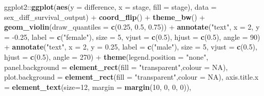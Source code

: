 \documentclass[]{article}
\newenvironment{Shaded}{\begin{snugshade}}{\end{snugshade}}
\newcommand{\KeywordTok}[1]{\textcolor[rgb]{0.13,0.29,0.53}{\textbf{{#1}}}}
\newcommand{\DataTypeTok}[1]{\textcolor[rgb]{0.13,0.29,0.53}{{#1}}}
\newcommand{\DecValTok}[1]{\textcolor[rgb]{0.00,0.00,0.81}{{#1}}}
\newcommand{\FloatTok}[1]{\textcolor[rgb]{0.00,0.00,0.81}{{#1}}}
\newcommand{\StringTok}[1]{\textcolor[rgb]{0.31,0.60,0.02}{{#1}}}
\newcommand{\OtherTok}[1]{\textcolor[rgb]{0.56,0.35,0.01}{{#1}}}
\newcommand{\NormalTok}[1]{{#1}}
\begin{document}
\begin{Shaded}
\begin{Highlighting}[]
\NormalTok{ggplot2::}\KeywordTok{ggplot}\NormalTok{(}\KeywordTok{aes}\NormalTok{(}\DataTypeTok{y =} \NormalTok{difference, }\DataTypeTok{x =} \NormalTok{stage, }\DataTypeTok{fill =} \NormalTok{stage), }
                \DataTypeTok{data =} \NormalTok{sex_diff_survival_output) +}\StringTok{ }
\StringTok{                }\KeywordTok{coord_flip}\NormalTok{() +}
\StringTok{                }\KeywordTok{theme_bw}\NormalTok{() +}
\StringTok{                }\KeywordTok{geom_violin}\NormalTok{(}\DataTypeTok{draw_quantiles =} \KeywordTok{c}\NormalTok{(}\FloatTok{0.25}\NormalTok{, }\FloatTok{0.5}\NormalTok{, }\FloatTok{0.75}\NormalTok{)) +}
\StringTok{                }\KeywordTok{annotate}\NormalTok{(}\StringTok{"text"}\NormalTok{, }\DataTypeTok{x =} \DecValTok{2}\NormalTok{, }\DataTypeTok{y =} \NormalTok{-}\FloatTok{0.25}\NormalTok{,}
                         \DataTypeTok{label =} \KeywordTok{c}\NormalTok{(}\StringTok{"female"}\NormalTok{), }\DataTypeTok{size =} \DecValTok{5}\NormalTok{,}
                         \DataTypeTok{vjust =} \KeywordTok{c}\NormalTok{(}\FloatTok{0.5}\NormalTok{), }\DataTypeTok{hjust =} \KeywordTok{c}\NormalTok{(}\FloatTok{0.5}\NormalTok{), }\DataTypeTok{angle =} \DecValTok{90}\NormalTok{) +}
\StringTok{                }\KeywordTok{annotate}\NormalTok{(}\StringTok{"text"}\NormalTok{, }\DataTypeTok{x =} \DecValTok{2}\NormalTok{, }\DataTypeTok{y =} \FloatTok{0.25}\NormalTok{,}
                         \DataTypeTok{label =} \KeywordTok{c}\NormalTok{(}\StringTok{"male"}\NormalTok{), }\DataTypeTok{size =} \DecValTok{5}\NormalTok{,}
                         \DataTypeTok{vjust =} \KeywordTok{c}\NormalTok{(}\FloatTok{0.5}\NormalTok{), }\DataTypeTok{hjust =} \KeywordTok{c}\NormalTok{(}\FloatTok{0.5}\NormalTok{), }\DataTypeTok{angle =} \DecValTok{270}\NormalTok{) +}
\StringTok{                }\KeywordTok{theme}\NormalTok{(}\DataTypeTok{legend.position =} \StringTok{"none"}\NormalTok{,}
                      \DataTypeTok{panel.background =} \KeywordTok{element_rect}\NormalTok{(}\DataTypeTok{fill =} \StringTok{"transparent"}\NormalTok{,}\DataTypeTok{colour =} \OtherTok{NA}\NormalTok{),}
                      \DataTypeTok{plot.background =} \KeywordTok{element_rect}\NormalTok{(}\DataTypeTok{fill =} \StringTok{"transparent"}\NormalTok{,}\DataTypeTok{colour =} \OtherTok{NA}\NormalTok{),}
                      \DataTypeTok{axis.title.x =} \KeywordTok{element_text}\NormalTok{(}\DataTypeTok{size=}\DecValTok{12}\NormalTok{, }\DataTypeTok{margin =} \KeywordTok{margin}\NormalTok{(}\DecValTok{10}\NormalTok{, }\DecValTok{0}\NormalTok{, }\DecValTok{0}\NormalTok{, }\DecValTok{0}\NormalTok{)),}

\end{Highlighting}
\end{Shaded}
\end{document}
